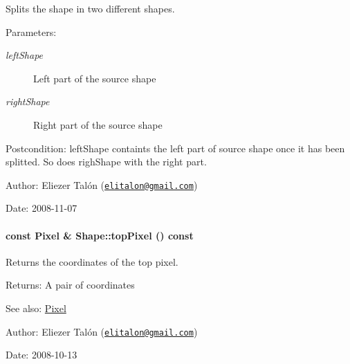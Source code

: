 Splits the shape in two different shapes. 

\begin{Desc}
\item[Parameters:]
\begin{description}
\item[{\em leftShape}]Left part of the source shape \item[{\em rightShape}]Right part of the source shape\end{description}
\end{Desc}
\begin{Desc}
\item[Postcondition:]leftShape containts the left part of source shape once it has been splitted. So does righShape with the right part.\end{Desc}
\begin{Desc}
\item[Author:]Eliezer Talón (\href{mailto:elitalon@gmail.com}{\tt elitalon@gmail.com}) \end{Desc}
\begin{Desc}
\item[Date:]2008-11-07 \end{Desc}
\hypertarget{class_shape_063c4934d8c1cd4b02e4e3e4a604f62e}{
\paragraph[{topPixel}]{\setlength{\rightskip}{0pt plus 5cm}const {\bf Pixel} \& Shape::topPixel () const}\hfill}
\label{class_shape_063c4934d8c1cd4b02e4e3e4a604f62e}


Returns the coordinates of the top pixel. 

\begin{Desc}
\item[Returns:]A pair of coordinates\end{Desc}
\begin{Desc}
\item[See also:]\hyperlink{_shape_8hpp_535e59456e3e633842529cfa8ea103c4}{Pixel}\end{Desc}
\begin{Desc}
\item[Author:]Eliezer Talón (\href{mailto:elitalon@gmail.com}{\tt elitalon@gmail.com}) \end{Desc}
\begin{Desc}
\item[Date:]2008-10-13 \end{Desc}


